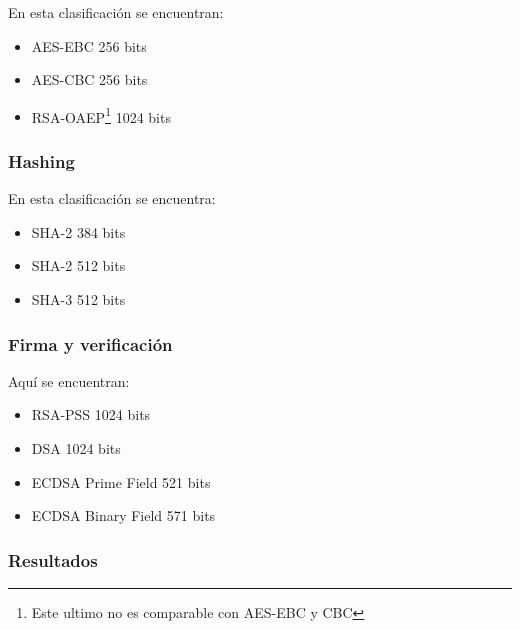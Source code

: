 \documentclass[../main.tex]{subfiles}
\begin{document}
En esta clasificación se encuentran:

\begin{itemize}
  \item AES-EBC 256 bits
  \item AES-CBC 256 bits
  \item RSA-OAEP\footnote{Este ultimo no es comparable con AES-EBC y CBC} 1024 bits
\end{itemize}




\subsubsection{Hashing}\label{hashing}

En esta clasificación se encuentra:

\begin{itemize}
  \item SHA-2 384 bits
  \item SHA-2 512 bits
  \item SHA-3 512 bits
\end{itemize}


\subsubsection{Firma y verificación}\label{firma-y-verificacion}

Aquí se encuentran:

\begin{itemize}
  \item RSA-PSS 1024 bits
  \item DSA 1024 bits
  \item ECDSA Prime Field 521 bits
  \item ECDSA Binary Field 571 bits
\end{itemize}

\subsubsection{Resultados}\label{sec:resultados}
\end{document}
